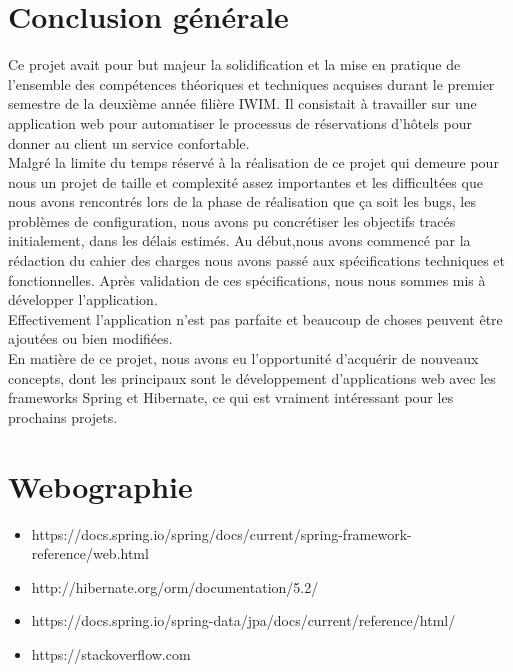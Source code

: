 \documentclass[12pt,a4paper]{report}
\begin{document}
		\chapter*{Conclusion générale} 
	Ce projet avait pour but majeur la solidification et la mise en
pratique de l’ensemble des compétences théoriques et techniques acquises durant le premier semestre de la deuxième année filière IWIM. Il
consistait à travailler sur une application web pour automatiser le processus de réservations d'hôtels pour donner au client un service confortable.\\
Malgré la limite du temps réservé à la réalisation de ce projet qui demeure pour nous un projet
de taille et complexité assez importantes et les difficultées que nous avons rencontrés lors de la phase de réalisation que ça soit les bugs, les problèmes de configuration, nous avons pu concrétiser les objectifs tracés initialement, dans les délais estimés. Au début,nous avons commencé par la rédaction du cahier des charges nous avons passé aux
spécifications techniques et fonctionnelles. Après validation de ces spécifications, nous nous sommes mis à développer l'application.\\
Effectivement l'application n'est pas parfaite et beaucoup de choses peuvent être ajoutées ou bien modifiées.\\
En matière de ce projet, nous avons eu l’opportunité d’acquérir de nouveaux concepts, dont les principaux sont le développement d'applications web avec les frameworks Spring et Hibernate, ce qui est vraiment intéressant pour les prochains projets.\\
	
	\chapter*{Webographie}
	
	\vspace{2cm}
	  \begin{itemize}

			\item https://docs.spring.io/spring/docs/current/spring-framework-reference/web.html
			\item http://hibernate.org/orm/documentation/5.2/
			\item https://docs.spring.io/spring-data/jpa/docs/current/reference/html/
			\item https://stackoverflow.com
		\end{itemize}
	
\end{document}
